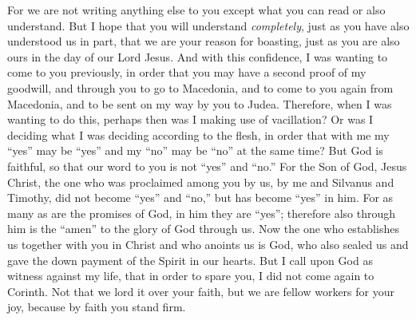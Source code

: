 \begin{biblechapter}
\verse For we are not writing anything else to you except what you can read or also understand. But I hope that you will understand \textit{completely},
\verse just as you have also understood us in part, that we are your reason for boasting, just as you are also ours in the day of our Lord Jesus.
 And with this confidence, I was wanting to come to you previously, in order that you may have a second proof of my goodwill,
\verse and through you to go to Macedonia, and to come to you again from Macedonia, and to be sent on my way by you to Judea.
\verse Therefore, when I was wanting to do this, perhaps then was I making use of vacillation? Or was I deciding what I was deciding according to the flesh, in order that with me my “yes” may be “yes” and my “no” may be “no” at the same time?
\verse But God is faithful, so that our word to you is not “yes” and “no.”
\verse For the Son of God, Jesus Christ, the one who was proclaimed among you by us, by me and Silvanus and Timothy, did not become “yes” and “no,” but has become “yes” in him.
\verse For as many as are the promises of God, in him they are “yes”; therefore also through him is the “amen” to the glory of God through us.
\verse Now the one who establishes us together with you in Christ and who anoints us is God,
\verse who also sealed us and gave the down payment of the Spirit in our hearts.
\verse But I call upon God as witness against my life, that in order to spare you, I did not come again to Corinth.
\verse Not that we lord it over your faith, but we are fellow workers for your joy, because by faith you stand firm.
\end{biblechapter}


